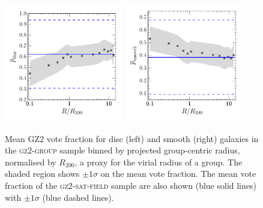 \begin{figure}
\includegraphics[width=0.46\textwidth]{environment/p_disc_trend_with_log_radius_field_compare.pdf}
\includegraphics[width=0.46\textwidth]{environment/p_smooth_trend_with_log_radius_field_compare.pdf}
\caption[Mean $p_d$ and $p_s$ with group radius in the \textsc{gz2-group} sample]{Mean GZ2 vote fraction for disc (left) and smooth (right) galaxies in the \textsc{gz2-group} sample binned by projected group-centric radius, normalised by $R_{200}$, a proxy for the virial radius of a group. The shaded region shows $\pm1\sigma$ on the mean vote fraction. The mean vote fraction of the \textsc{gz2-sat-field} sample are also shown (blue solid lines) with $\pm1\sigma$ (blue dashed lines).}
\label{fig:morphradius}
\end{figure}

